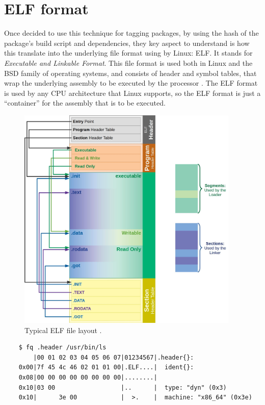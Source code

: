 \FloatBarrier
\section{ELF format}
\label{sec:elf-format}

Once decided to use this technique for tagging packages, by
using the hash of the package's build script and
dependencies, they key aspect to understand is how this
translate into the underlying file format using by Linux:
ELF. It stands for \textit{Executable and Linkable Format}.
This file format is used both in Linux and the BSD family of
operating systems, and consists of header and symbol tables,
that wrap the underlying assembly to be executed by the
processor \cite{LinuxFoundationReferenced}. The ELF format
is used by any CPU architecture that Linux supports, so the
ELF format is just a ``container'' for the assembly that is
to be executed.

\begin{figure}[hbt]
    \centerfloat
    \includegraphics[width=300pt]{assets/typical_elf.jpg}
    \caption{Typical ELF file layout \cite{HW3238POperating}
    .}
    \label{fig:elf-layout}
\end{figure}


    \begin{verbatim}
    $ fq .header /usr/bin/ls
        |00 01 02 03 04 05 06 07|01234567|.header{}:
    0x00|7f 45 4c 46 02 01 01 00|.ELF....|  ident{}:
    0x08|00 00 00 00 00 00 00 00|........|
    0x10|03 00                  |..      |  type: "dyn" (0x3)
    0x10|      3e 00            |  >.    |  machine: "x86_64" (0x3e)
    \end{verbatim}


